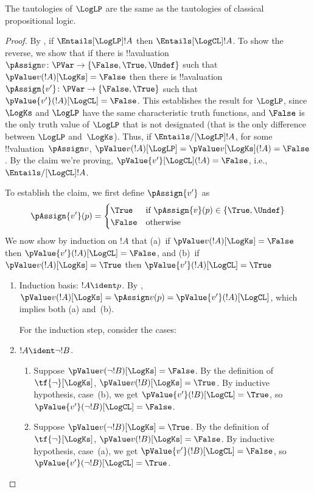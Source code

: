 \documentclass[../../../include/open-logic-section]{subfiles}
\begin{document}
\begin{prop} The tautologies of $\LogLP$  are
  the same as the tautologies of classical propositional logic.
\end{prop}

\begin{proof}
  By , if $\Entails[\LogLP] !A$ then
  $\Entails[\LogCL] !A$. To show the reverse, we show that if there is
  !!a{valuation}~$\pAssign v\colon \PVar \to \{\False, \True,
  \Undef\}$ such that $\pValue v(!A)[\LogKs] = \False$ then there is
  !!a{valuation}~$\pAssign {v'}\colon \PVar \to \{\False, \True\}$
  such that $\pValue {v'}(!A)[\LogCL] = \False$. This establishes the
  result for $\LogLP$, since $\LogKs$ and $\LogLP$ have the same
  characteristic truth functions, and $\False$ is the only truth value
  of $\LogLP$ that is not designated (that is the only difference
  between $\LogLP$ and~$\LogKs$). Thus, if $\Entails/[\LogLP] !A$, for
  some !!{valuation}~$\pAssign v$, $\pValue v(!A)[\LogLP] = \pValue
  v[\LogKs](!A) = \False$. By the claim we're proving,
  $\pValue{v'}[\LogCL](!A) = \False$, i.e., $\Entails/[\LogCL] !A$.
  
  To establish the claim, we first define $\pAssign {v'}$ as
  \[
    \pAssign {v'}(p) = 
    \begin{cases}
    \True & \text{if } \pAssign {v}(p) \in \{\True, \Undef\}\\
    \False & \text{otherwise}
  \end{cases}
  \]
  We now show by induction on $!A$ that (a)~if $\pValue v(!A)[\LogKs]
  = \False$ then $\pValue {v'}(!A)[\LogCL] = \False$, and (b)~if
  $\pValue v(!A)[\LogKs] = \True$ then $\pValue {v'}(!A)[\LogCL] =
  \True$
  \begin{enumerate}
    \item Induction basis: $!A \ident p$. By
    , $\pValue v(!A)[\LogKs]
    = \pAssign v(p) = \pValue {v'}(!A)[\LogCL]$, which implies both (a)
    and~(b).
    
    For the induction step, consider the cases:
    \item $!A \ident \lnot !B$. 
    \begin{enumerate}
      \item Suppose $\pValue v(\lnot!B)[\LogKs] = \False$. By the
      definition of $\tf{\lnot}[\LogKs]$, $\pValue v(!B)[\LogKs]  =
      \True$. By inductive hypothesis, case~(b), we get $\pValue
      {v'}(!B)[\LogCL]  = \True$, so $\pValue {v'}(\lnot !B)[\LogCL] = \False$.
      \item Suppose $\pValue v(\lnot!B)[\LogKs] = \True$. By the
      definition of $\tf{\lnot}[\LogKs]$, $\pValue v(!B)[\LogKs]  =
      \False$. By inductive hypothesis, case~(a), we get $\pValue
      {v'}(!B)[\LogCL]  = \False$, so $\pValue {v'}(\lnot !B)[\LogCL] = \True$.
    \end{enumerate}


\end{enumerate}
\end{proof}
\end{document}
